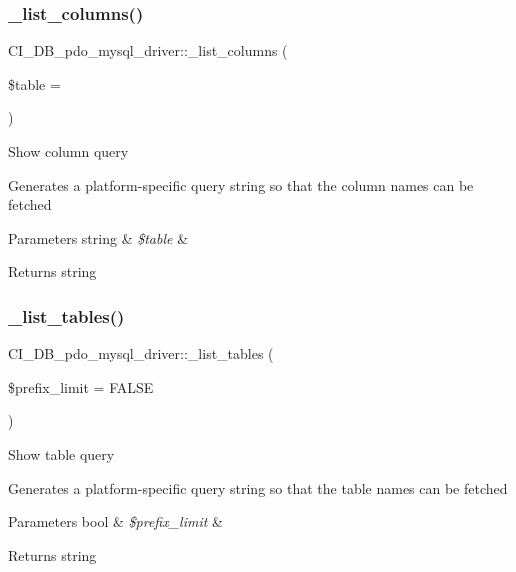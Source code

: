 \subsubsection{\texorpdfstring{\+\_\+list\+\_\+columns()}{\_list\_columns()}}
{\footnotesize\ttfamily C\+I\+\_\+\+D\+B\+\_\+pdo\+\_\+mysql\+\_\+driver\+::\+\_\+list\+\_\+columns (\begin{DoxyParamCaption}\item[{}]{\$table = {\ttfamily \textquotesingle{}\textquotesingle{}} }\end{DoxyParamCaption})\hspace{0.3cm}{\ttfamily [protected]}}

Show column query

Generates a platform-\/specific query string so that the column names can be fetched


\begin{DoxyParams}[1]{Parameters}
string & {\em \$table} & \\
\hline
\end{DoxyParams}
\begin{DoxyReturn}{Returns}
string 
\end{DoxyReturn}
\mbox{\label{class_c_i___d_b__pdo__mysql__driver_ae4283cbd0dfd9d662baaac23852c1d37}} 
\subsubsection{\texorpdfstring{\+\_\+list\+\_\+tables()}{\_list\_tables()}}
{\footnotesize\ttfamily C\+I\+\_\+\+D\+B\+\_\+pdo\+\_\+mysql\+\_\+driver\+::\+\_\+list\+\_\+tables (\begin{DoxyParamCaption}\item[{}]{\$prefix\+\_\+limit = {\ttfamily FALSE} }\end{DoxyParamCaption})\hspace{0.3cm}{\ttfamily [protected]}}

Show table query

Generates a platform-\/specific query string so that the table names can be fetched


\begin{DoxyParams}[1]{Parameters}
bool & {\em \$prefix\+\_\+limit} & \\
\hline
\end{DoxyParams}
\begin{DoxyReturn}{Returns}
string 
\end{DoxyReturn}
\mbox{\label{class_c_i___d_b__pdo__mysql__driver_a6616451139c0bbcdadcf9bf1a268cf94}} 
